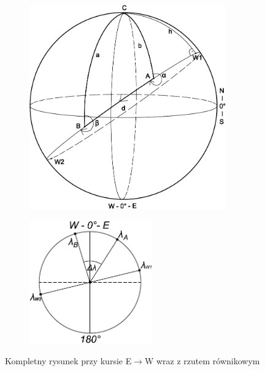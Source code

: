 \documentclass[10pt, twoside, fleqn]{article}
\begin{document}
					\vspace{50pt}	
					
					\begin{figure}[h!]
						\centering
						\begin{subfigure}{.5\textwidth}
  							\begin{flushleft}
  							\includegraphics[height=250pt]
  											{katy_EW.pdf}
  							\end{flushleft}
						\end{subfigure}%
						\begin{subfigure}{.5\textwidth}
						  	\begin{flushright}
  							\includegraphics[height=150pt]
  											{rzut_rownik_EW.pdf}							
  							\end{flushright}
						\end{subfigure}
						 \caption{Kompletny rysunek przy
  								  kursie E$\longrightarrow$W wraz z
  								  rzutem równikowym}
  						 \label{fig:e-w}
					\end{figure}	
			
		\newpage
		\leavevmode
		\thispagestyle{empty}
		\newpage
			
	
\end{document}
